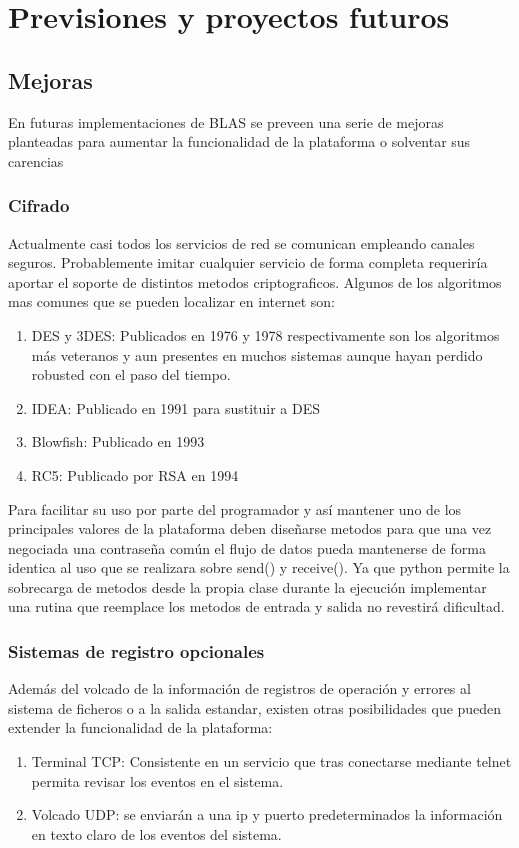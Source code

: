 \documentclass[a4paper,spanish,12pt]{book}
\begin{document}
\chapter{Previsiones y proyectos futuros}
\section{Mejoras}
En futuras implementaciones de BLAS se preveen una serie de mejoras planteadas para aumentar la funcionalidad de la plataforma o solventar sus carencias

\subsection{Cifrado}
Actualmente casi todos los servicios de red se comunican empleando canales seguros. Probablemente imitar cualquier servicio de forma completa requeriría aportar el soporte de distintos metodos criptograficos. Algunos de los algoritmos mas comunes que se pueden localizar en internet son:
\begin{enumerate}
	\item{DES y 3DES: Publicados en 1976 y 1978 respectivamente son los algoritmos más veteranos y aun presentes en muchos sistemas aunque hayan perdido robusted con el paso del tiempo.}
	\item{IDEA: Publicado en 1991 para sustituir a DES}
	\item{Blowfish: Publicado en 1993}
	\item{RC5: Publicado por RSA en 1994}
\end{enumerate}
Para facilitar su uso por parte del programador y así mantener uno de los principales valores de la plataforma deben diseñarse metodos para que una vez negociada una contraseña común el flujo de datos pueda mantenerse de forma identica al uso que se realizara sobre send() y receive(). Ya que python permite la sobrecarga de metodos desde la propia clase durante la ejecución implementar una rutina que reemplace los metodos de entrada y salida no revestirá dificultad.

\subsection{Sistemas de registro opcionales}
Además del volcado de la información de registros de operación y errores al sistema de ficheros o a la salida estandar, existen otras posibilidades que pueden extender la funcionalidad de la plataforma:
\begin{enumerate}
	\item{Terminal TCP: Consistente en un servicio que tras conectarse mediante telnet permita revisar los eventos en el sistema.}
	\item{Volcado UDP: se enviarán a una ip y puerto predeterminados la información en texto claro de los eventos del sistema.}
\end{enumerate}
\end{document}
